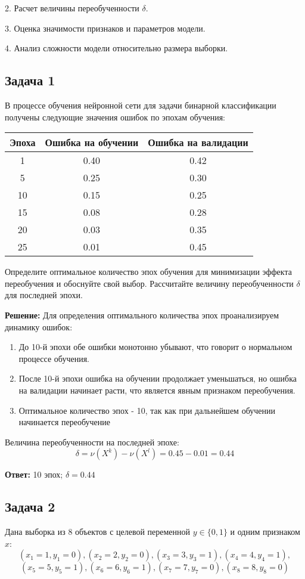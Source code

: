 2. Расчет величины переобученности $\delta$.

3. Оценка значимости признаков и параметров модели.

4. Анализ сложности модели относительно размера выборки.

\subsection*{Задача 1}
В процессе обучения нейронной сети для задачи бинарной классификации получены следующие значения ошибок по эпохам обучения:

\begin{center}
\begin{tabular}{|c|c|c|}
\hline
Эпоха & Ошибка на обучении & Ошибка на валидации \\
\hline
1 & 0.40 & 0.42 \\
5 & 0.25 & 0.30 \\
10 & 0.15 & 0.25 \\
15 & 0.08 & 0.28 \\
20 & 0.03 & 0.35 \\
25 & 0.01 & 0.45 \\
\hline
\end{tabular}
\end{center}

Определите оптимальное количество эпох обучения для минимизации эффекта переобучения и обоснуйте свой выбор. Рассчитайте величину переобученности $\delta$ для последней эпохи.

\textbf{Решение:}
Для определения оптимального количества эпох проанализируем динамику ошибок:
\begin{enumerate}
    \item До 10-й эпохи обе ошибки монотонно убывают, что говорит о нормальном процессе обучения.
    \item После 10-й эпохи ошибка на обучении продолжает уменьшаться, но ошибка на валидации начинает расти, что является явным признаком переобучения.
    \item Оптимальное количество эпох - 10, так как при дальнейшем обучении начинается переобучение
\end{enumerate}

Величина переобученности на последней эпохе:
$$\delta = \nu(X^k) - \nu(X^l) = 0.45 - 0.01 = 0.44$$

\textbf{Ответ:} 10 эпох; $\delta = 0.44$

\subsection*{Задача 2}
Дана выборка из 8 объектов с целевой переменной $y \in \{0,1\}$ и одним признаком $x$:
$$(x_1=1, y_1=0), (x_2=2, y_2=0), (x_3=3, y_3=1), (x_4=4, y_4=1),$$
$$(x_5=5, y_5=1), (x_6=6, y_6=1), (x_7=7, y_7=0), (x_8=8, y_8=0)$$

